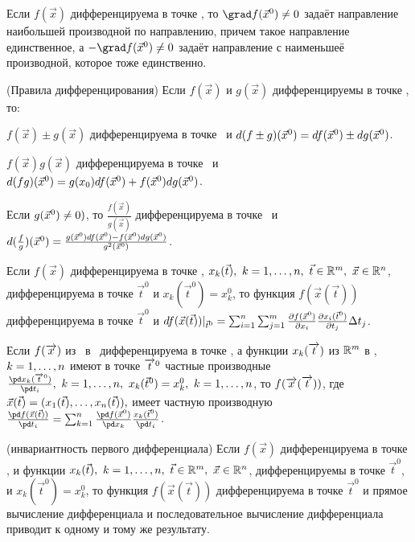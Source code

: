 \documentclass[unicode,10pt]{article}
\newcommand{\билет}[1]{\par\medskip\noindent{\large \textsf{Билет #1.}}\par}
\begin{document}
\begin{theorem} Если $f(\vec x)$ дифференцируема в точке , то $\grad f(\vxx)\ne0$ задаёт направление наибольшей производной по направлению, причем такое направление единственное, а $-\grad f(\vxx)\ne 0$ задаёт направление  с наименьшеё производной, которое тоже единственно.
\end{theorem}

\hspace{-5mm} (Правила дифференцирования) Если $f(\vec x)$ и $g(\vec x)$ дифференцируемы в точке , то:

 $f(\vec x)\pm g(\vec x)$ дифференцируема в точке \ и $d(f\pm g)(\vec x^0)=df(\vec x^0)\pm dg(\vec x^0)$.

 $f(\vec x) g(\vec x)$ дифференцируема в точке \ и $d(fg)(\vec x^0)=g(x_0)df(\vec x^0)+f(\vec x^0)dg(\vec x^0)$.

 Если $g(\vec x^0)\ne0)$, то $\frac{f(\vec x)}{g(\vec x)}$ дифференцируема в точке \ и
$d(\frac{f}{g})(\vec x^0)=\frac{g(\vec x^0)df(\vec x^0)-f(\vec x^0)dg(\vec x^0)}{g^2(\vec x^0)}$.

 Если $f(\vec x)$ дифференцируема в точке , $x_k(\vec t),\ k=1,\bnl,n,\ \vec t\in \hh^m,\ \vec
x\in\hy$, дифференцируема в точке $\vec t^0$ и $x_k(\vec t^0)=x_k^0$, то функция $f(\vec x(\vec t))$
дифференцируема в точке $\vec t^0$ и $df(\vec x(\vec t))|_{\vec t^0}=\sum_{i=1}^n\sum_{j=1}^m
\frac{\partial f(\vec x^0)}{\partial x_i}\frac{\partial x_i(\vec t^0)}{\partial t_j}\Delta t_j$.

\begin{imp}
Если $f(\overrightarrow x)$ из \ в \ дифференцируема в точке , а функции $x_k(\overrightarrow t)$ из $\mathbb R^m$ в ,
$k=1,\ldots,n$ имеют в точке $\overrightarrow t^0$ частные производные  $\frac{\pd x_k(\drn t^0)}{\pd t_i},\ k=1,\bnl,n,\
x_k(\vec t^0)=x_k^0,\ k=1,\bnl,n$, то $f(\overrightarrow x(\overrightarrow t))$, где $\vec x (\vec t)=(x_1(\vec t),\ldots,x_n(\vec
t)),$ имеет частную производную $\frac{\pd f(\vec x(\vec t))}{\pd t_i}=\summ \frac{\pd f(\vxx)}{\pd
x_k}\frac{x_k(\vec t^0)}{\pd t_i}$.
\end{imp}

\begin{imp}
(инвариантность первого дифференциала) Если $f(\vec x)$ дифференцируема в точке , и функции $x_k(\vec t),\
k=1,\ldots,n,\ \vec t\in \mathbb R^m,\ \vec x\in\mathbb R^n$, дифференцируемы в точке $\vec t^0$, и $x_k(\vec t^0)=x_k^0$, то
функция $f(\vec x(\vec t))$ дифференцируема в точке $\vec t^0$ и прямое вычисление дифференциала и
последовательное вычисление дифференциала приводит к одному и тому же результату.
\end{imp}
\end{document}
